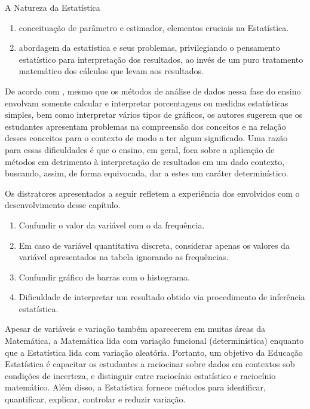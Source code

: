 \begin{apresentacao}{A Natureza da Estatística}
\begin{enumerate}
\item {} 
conceituação de parâmetro e estimador, elementos cruciais na Estatística.

\item {} 
abordagem da estatística e seus problemas, privilegiando o pensamento estatístico para interpretação dos resultados, ao invés de um puro tratamento matemático dos cálculos que levam aos resultados.

\end{enumerate}

De acordo com \citet{batanero2016}, mesmo que os métodos de análise de dados nessa fase do ensino envolvam somente calcular e interpretar porcentagens  ou medidas estatísticas simples, bem como interpretar vários tipos de gráficos, os autores sugerem que os estudantes apresentam problemas na compreensão dos conceitos e na relação desses conceitos para o contexto de modo a ter algum significado. Uma razão para essas dificuldades é que o ensino, em geral, foca sobre a aplicação de métodos em detrimento à interpretação de resultados em um dado contexto, buscando, assim, de forma equivocada, dar a estes um caráter determinístico.

Os distratores apresentados a seguir refletem a experiência dos envolvidos com o desenvolvimento desse capítulo.
\begin{enumerate}
\item {} 
Confundir o valor da variável com o da frequência.

\item {} 
Em caso de variável quantitativa discreta, considerar apenas os valores da variável apresentados na tabela ignorando as frequências.

\item {} 
Confundir gráfico de barras com o histograma.

\item {} 
Dificuldade de interpretar um resultado obtido via procedimento de inferência estatística.

\end{enumerate}

Apesar de variáveis e variação também aparecerem em muitas áreas da Matemática, a Matemática lida com variação funcional (determinística) enquanto que a Estatística lida com variação aleatória. Portanto, um objetivo da Educação Estatística é capacitar os estudantes a raciocinar sobre dados em contextos sob condições de incerteza, e distinguir entre raciocínio estatístico e raciocínio matemático. Além disso, a Estatística fornece métodos para identificar, quantificar, explicar, controlar e reduzir variação.


\end{apresentacao}
